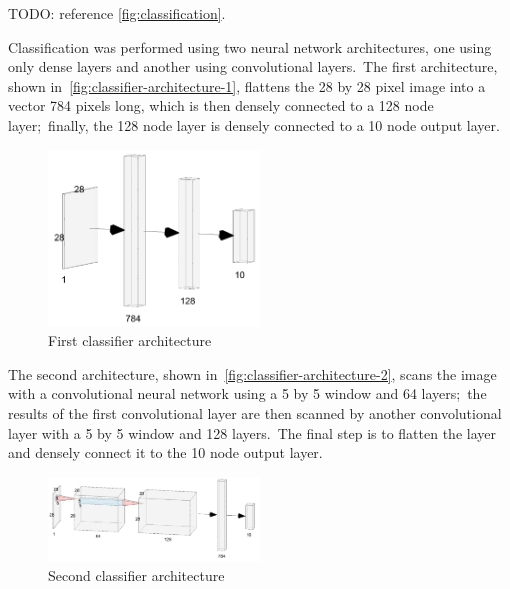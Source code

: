 \documentclass[conference]{IEEEtran}
\begin{document}
    TODO: reference \autoref{fig:classification}.

    Classification was performed using two neural network architectures, one using only dense layers and another using convolutional layers.\ The first architecture, shown in~\autoref{fig:classifier-architecture-1}, flattens the 28 by 28 pixel image into a vector 784 pixels long, which is then densely connected to a 128 node layer;\ finally, the 128 node layer is densely connected to a 10 node output layer.

    \begin{figure}[!h]
        \caption{First classifier architecture}
        \label{fig:classifier-architecture-1}
        \begin{center}
            \includegraphics[width=0.5\textwidth]{First_Classifier_Architecture.png}
        \end{center}
    \end{figure}

    The second architecture, shown in~\autoref{fig:classifier-architecture-2}, scans the image with a convolutional neural network using a 5 by 5 window and 64 layers;\ the results of the first convolutional layer are then scanned by another convolutional layer with a 5 by 5 window and 128 layers.\ The final step is to flatten the layer and densely connect it to the 10 node output layer.

    \begin{figure}[!h]
        \caption{Second classifier architecture}
        \label{fig:classifier-architecture-2}
        \begin{center}
            \includegraphics[width=0.5\textwidth]{Second_Classifier_Architecture.png}
        \end{center}
    \end{figure}
\end{document}
